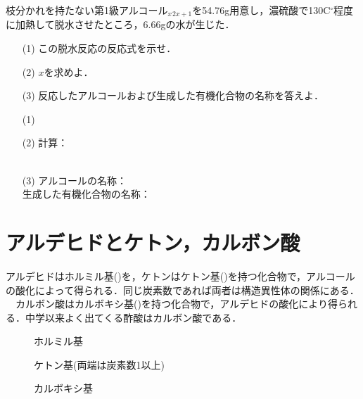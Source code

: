 \documentclass[a4paper,12pt]{ltjsreport}
\begin{document}
        \newpage
        \begin{que}
         枝分かれを持たない第1級アルコール$_{x}$$_{2x+1}$を54.76g用意し，濃硫酸で130C$^\circ$程度に加熱して脱水させたところ，$6.66$gの水が生じた．
      \begin{itemize}
        \item [(1)]この脱水反応の反応式を示せ．
        \item [(2)]$x$を求めよ．
        \item [(3)]反応したアルコールおよび生成した有機化合物の名称を答えよ．
      \end{itemize}
        \end{que}
        \ans
        \begin{itemize}
            \item [(1)]　\\[15pt]
            \item [(2)]計算：\\[100pt]
            \\
            \item [(3)]アルコールの名称：\\[35pt]
        生成した有機化合物の名称：
        \end{itemize}
        \newpage
        \section{アルデヒドとケトン，カルボン酸}
        アルデヒドはホルミル基()を，ケトンはケトン基()を持つ化合物で，{\color{red}アルコールの酸化によって得られる．}同じ炭素数であれば両者は構造異性体の関係にある．\\
　カルボン酸はカルボキシ基()を持つ化合物で，{\color{red}アルデヒドの酸化により得られる．}中学以来よく出てくる酢酸はカルボン酸である．\\
\begin{minipage}{0.25\linewidth}
\begin{figure}[H]
\centering
{}
\caption{ホルミル基}
\end{figure}
\end{minipage}
\begin{minipage}{0.5\linewidth}
\begin{figure}[H]
\centering
{}
\caption{ケトン基(両端は炭素数1以上)}
\end{figure}
\end{minipage}
\begin{minipage}{0.25\linewidth}
\begin{figure}[H]
    \centering
\caption{カルボキシ基} 
\end{figure}
\end{minipage}
\end{document}
